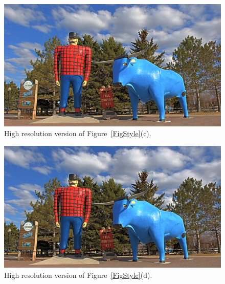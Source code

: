 \begin{figure}
\begin{center}
\includegraphics[width=\textwidth]{figures/chapter5/style_based/PaulBunyan_hdrcandy_w0_1.png}
\caption{High resolution version of Figure~\ref{FigStyle}(c).}
\end{center}
\end{figure}

\begin{figure}
\begin{center}
\includegraphics[width=\textwidth]{figures/chapter5/style_based/PaulBunyan_hdrcandy_w0_w1_w2.png}
\caption{High resolution version of Figure~\ref{FigStyle}(d).}
\end{center}
\end{figure}

